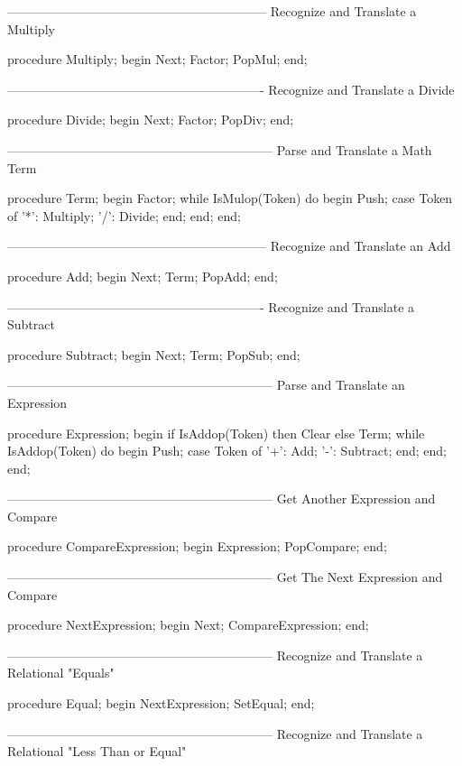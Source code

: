 \documentclass[float=false, crop=false]{standalone}
\begin{document}
\begin{code}
{--------------------------------------------------------------}
{ Recognize and Translate a Multiply }

procedure Multiply;
begin
   Next;
   Factor;
   PopMul;
end;


{-------------------------------------------------------------}
{ Recognize and Translate a Divide }

procedure Divide;
begin
   Next;
   Factor;
   PopDiv;
end;


{---------------------------------------------------------------}
{ Parse and Translate a Math Term }

procedure Term;
begin
   Factor;
   while IsMulop(Token) do begin
      Push;
      case Token of
       '*': Multiply;
       '/': Divide;
      end;
   end;
end;


{--------------------------------------------------------------}
{ Recognize and Translate an Add }

procedure Add;
begin
   Next;
   Term;
   PopAdd;
end;


{-------------------------------------------------------------}
{ Recognize and Translate a Subtract }

procedure Subtract;
begin
   Next;
   Term;
   PopSub;
end;


{---------------------------------------------------------------}
{ Parse and Translate an Expression }

procedure Expression;
begin
   if IsAddop(Token) then
      Clear
   else
      Term;
   while IsAddop(Token) do begin
      Push;
      case Token of
       '+': Add;
       '-': Subtract;
      end;
   end;
end;


{---------------------------------------------------------------}
{ Get Another Expression and Compare }

procedure CompareExpression;
begin
   Expression;
   PopCompare;
end;


{---------------------------------------------------------------}
{ Get The Next Expression and Compare }

procedure NextExpression;
begin
   Next;
   CompareExpression;
end;


{---------------------------------------------------------------}
{ Recognize and Translate a Relational "Equals" }

procedure Equal;
begin
   NextExpression;
   SetEqual;
end;


{---------------------------------------------------------------}
{ Recognize and Translate a Relational "Less Than or Equal" }


\end{code}
\end{document}
